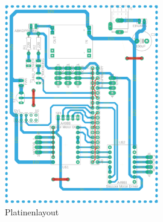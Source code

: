 \begin{figure}[H]
	\centering
	\includegraphics[width=0.6\textwidth]{images/Hardware/Layout}
	\caption{Platinenlayout}
	\label{layout}
\end{figure}





